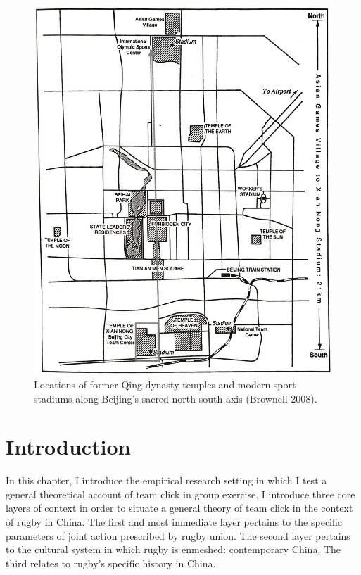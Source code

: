\begin{CJK}{UTF8}{gbsn}
\begin{figure}[htbp]
    \centering
  \includegraphics[scale =.1]{images/beijingTemplesXNT.png}
  \caption{Locations of former Qing dynasty temples and modern sport stadiums along Beijing's sacred north-south axis (Brownell 2008).}
  \label{fig:beijingTemplesXNT}
\end{figure}



\section{Introduction}
In this chapter, I introduce the empirical research setting in which I test a general theoretical account of team click in group exercise.  I introduce three core layers of context in order to situate a general theory of team click in the context of rugby in China.  The first and most immediate layer pertains to the specific parameters of joint action prescribed by rugby union.  The second layer pertains to the cultural system in which rugby is enmeshed: contemporary China. The third relates to rugby's specific history in China.


\end{CJK}
